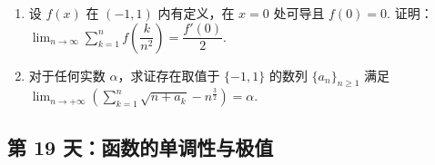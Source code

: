 \newpage

\begin{enumerate}[label=\textbf{\arabic*.}, itemsep=6cm, resume]
    \item 设 $f(x)$ 在 $(-1,1)$ 内有定义，在 $x=0$ 处可导且 $f(0)=0$. 证明：
    $ \lim_{n\to\infty}\sum_{k=1}^n f\left(\dfrac{k}{n^2}\right)=\dfrac{f'(0)}{2}. $
    
    \item 对于任何实数 $\alpha$，求证存在取值于 $\{-1,1\}$ 的数列 $\{a_n\}_{n\ge1}$ 满足
    $ \lim_{n\to+\infty}\left(\sum_{k=1}^n\sqrt{n+a_k}-n^{\frac{3}{2}}\right)=\alpha. $
\end{enumerate}

\newpage

\subsection*{第 19 天：函数的单调性与极值}
\vspace{1cm}

